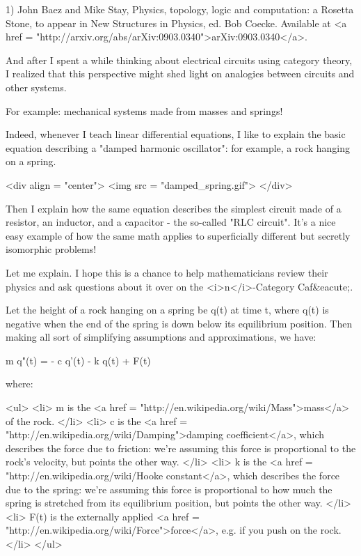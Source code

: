 1) John Baez and Mike Stay, Physics, topology, logic and computation:
a Rosetta Stone, to appear in New Structures in Physics, ed. Bob
Coecke.  Available at <a href = "http://arxiv.org/abs/arXiv:0903.0340">arXiv:0903.0340</a>.

And after I spent a while thinking about electrical circuits using
category theory, I realized that this perspective might shed light on
analogies between circuits and other systems.

For example: mechanical systems made from masses and springs!  

Indeed, whenever I teach linear differential equations, I like to
explain the basic equation describing a "damped harmonic
oscillator": for example, a rock hanging on a spring.

<div align = "center">
<img src = "damped_spring.gif">
</div>

Then I explain how the same equation describes the simplest circuit
made of a resistor, an inductor, and a capacitor - the so-called
"RLC circuit".  It's a nice easy example of how the same
math applies to superficially different but secretly isomorphic
problems!

Let me explain.  I hope this is a chance to help mathematicians review
their physics and ask questions about it over on the <i>n</i>-Category 
Caf&eacute;.

Let the height of a rock hanging on a spring be q(t) at time t, where
q(t) is negative when the end of the spring is down below its
equilibrium position.  Then making all sort of simplifying assumptions
and approximations, we have:

m q"(t) = - c q'(t) - k q(t) + F(t)

where:

<ul>
<li>
   m is the <a href = "http://en.wikipedia.org/wiki/Mass">mass</a> of the rock.
</li>
<li>
   c is the <a href = "http://en.wikipedia.org/wiki/Damping">damping 
   coefficient</a>, which describes the force due to
   friction: we're assuming this force is proportional to the rock's
   velocity, but points the other way.
</li>
<li>
   k is the <a href = "http://en.wikipedia.org/wiki/Hooke%
   constant</a>, which describes the force due to the
   spring: we're assuming this force is proportional to how much the
   spring is stretched from its equilibrium position, but points the
   other way.
</li>
<li>
   F(t) is the externally applied <a href =
   "http://en.wikipedia.org/wiki/Force">force</a>, e.g. if you push on
   the rock.  
</li> 
</ul>

